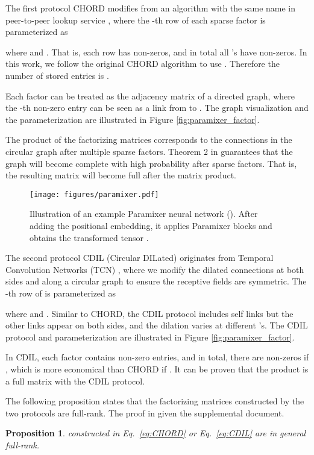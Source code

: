 \documentclass{article}
\newtheorem{prop}[theorem]{Proposition}
\begin{document}
The first protocol CHORD modifies from an algorithm with the same name in peer-to-peer lookup service \cite{chord}, where the -th row of each sparse factor  is parameterized as

where  and . That is, each row has  non-zeros, and in total all 's have  non-zeros. In this work, we follow the original CHORD algorithm to use . Therefore the number of stored entries is . 

Each factor  can be treated as the adjacency matrix of a directed graph, where the -th non-zero entry can be seen as a link from  to . The graph visualization and the parameterization are illustrated in Figure \ref{fig:paramixer_factor}.

The product of the factorizing matrices corresponds to the connections in the circular graph after multiple sparse factors. Theorem 2 in \cite{chord} guarantees that the graph will become complete with high probability after  sparse factors. That is, the resulting  matrix will become full after the matrix product.

\begin{figure*}[t]
	\begin{center}
		\texttt{[image: figures/paramixer.pdf]}
	\end{center}
	\caption{Illustration of an example Paramixer neural network (). After adding the positional embedding, it applies  Paramixer blocks and obtains the transformed tensor .}
	\label{fig:paramixer_nn}
\end{figure*}

The second protocol CDIL (Circular DILated) originates from Temporal Convolution Networks (TCN) \cite{tcn}, where we modify the dilated connections at both sides and along a circular graph to ensure the receptive fields are symmetric. The -th row of  is parameterized as 

where  and .
Similar to CHORD, the CDIL protocol includes self links but the other links appear on both sides, and the dilation  varies at different 's. The CDIL protocol and parameterization are illustrated in Figure \ref{fig:paramixer_factor}.

In CDIL, each factor contains  non-zero entries, and in total, there are  non-zeros if , which is more economical than CHORD if . It can be proven that the product  is a full matrix with the CDIL protocol. 

The following proposition states that the factorizing matrices constructed by the two protocols are full-rank. The proof in given the supplemental document.
\begin{prop}
 constructed in Eq.~\ref{eq:CHORD} or Eq.~\ref{eq:CDIL} are in general full-rank.
\end{prop}
\end{document}
